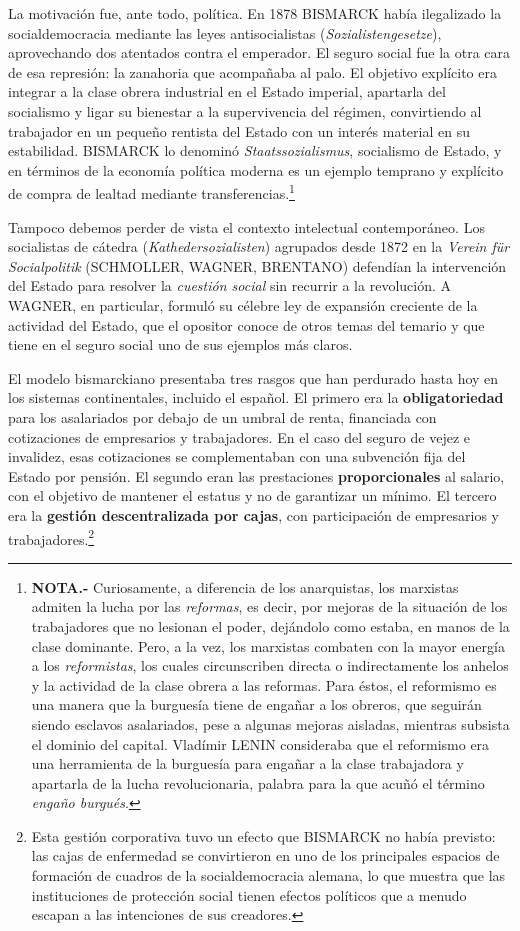 \documentclass[10pt,a4paper]{article}
\begin{document}
La motivación fue, ante todo, política. En 1878 BISMARCK había ilegalizado la socialdemocracia mediante las leyes antisocialistas (\textit{Sozialistengesetze}), aprovechando dos atentados contra el emperador. El seguro social fue la otra cara de esa represión: la zanahoria que acompañaba al palo. El objetivo explícito era integrar a la clase obrera industrial en el Estado imperial, apartarla del socialismo y ligar su bienestar a la supervivencia del régimen, convirtiendo al trabajador en un pequeño rentista del Estado con un interés material en su estabilidad. BISMARCK lo denominó \textit{Staatssozialismus}, socialismo de Estado, y en términos de la economía política moderna es un ejemplo temprano y explícito de compra de lealtad mediante transferencias.\footnote{%
    \textbf{NOTA.-} Curiosamente, a diferencia de los anarquistas, los marxistas admiten la lucha por las \textit{reformas}, es decir, por mejoras de la situación de los trabajadores que no lesionan el poder, dejándolo como estaba, en manos de la clase dominante. Pero, a la vez, los marxistas combaten con la mayor energía a los \textit{reformistas}, los cuales circunscriben directa o indirectamente los anhelos y la actividad de la clase obrera a las reformas. Para éstos, el reformismo es una manera que la burguesía tiene de engañar a los obreros, que seguirán siendo esclavos asalariados, pese a algunas mejoras aisladas, mientras subsista el dominio del capital. Vladímir LENIN consideraba que el reformismo era una herramienta de la burguesía para engañar a la clase trabajadora y apartarla de la lucha revolucionaria, palabra para la que acuñó el término \textit{engaño burgués}.
}

Tampoco debemos perder de vista el contexto intelectual contemporáneo. Los socialistas de cátedra (\textit{Kathedersozialisten}) agrupados desde 1872 en la \textit{Verein für Socialpolitik} (SCHMOLLER, WAGNER, BRENTANO) defendían la intervención del Estado para resolver la \textit{cuestión social} sin recurrir a la revolución. A WAGNER, en particular, formuló su célebre ley de expansión creciente de la actividad del Estado, que el opositor conoce de otros temas del temario y que tiene en el seguro social uno de sus ejemplos más claros.

El modelo bismarckiano presentaba tres rasgos que han perdurado hasta hoy en los sistemas continentales, incluido el español. El primero era la \textbf{obligatoriedad} para los asalariados por debajo de un umbral de renta, financiada con cotizaciones de empresarios y trabajadores. En el caso del seguro de vejez e invalidez, esas cotizaciones se complementaban con una subvención fija del Estado por pensión. El segundo eran las prestaciones \textbf{proporcionales} al salario, con el objetivo de mantener el estatus y no de garantizar un mínimo. El tercero era la \textbf{gestión descentralizada por cajas}, con participación de empresarios y trabajadores.\footnote{%
    Esta gestión corporativa tuvo un efecto que BISMARCK no había previsto: las cajas de enfermedad se convirtieron en uno de los principales espacios de formación de cuadros de la socialdemocracia alemana, lo que muestra que las instituciones de protección social tienen efectos políticos que a menudo escapan a las intenciones de sus creadores.
}
\end{document}

